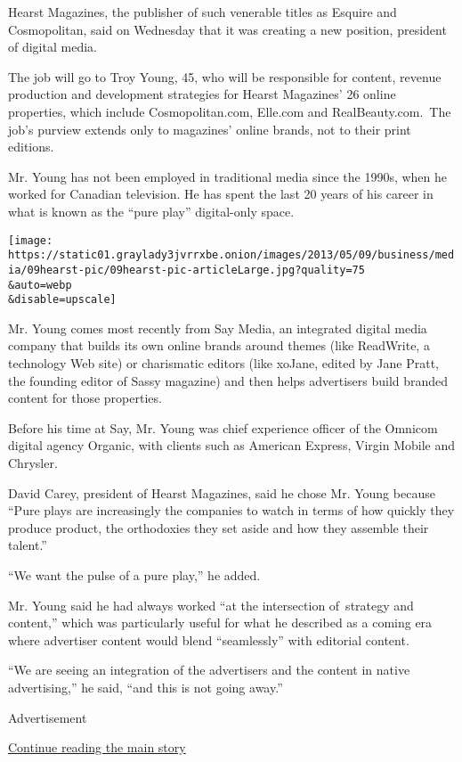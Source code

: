 Hearst Magazines, the publisher of such venerable titles as Esquire and
Cosmopolitan, said on Wednesday that it was creating a new position,
president of digital media.

The job will go to Troy Young, 45, who will be responsible for content,
revenue production and development strategies for Hearst Magazines' 26
online properties, which include Cosmopolitan.com, Elle.com and
RealBeauty.com.~The job's purview extends only to magazines' online
brands, not to their print editions.

Mr. Young has not been employed in traditional media since the 1990s,
when he worked for Canadian television. He has spent the last 20 years
of his career in what is known as the ``pure play'' digital-only space.

\texttt{[image: https://static01.graylady3jvrrxbe.onion/images/2013/05/09/business/media/09hearst-pic/09hearst-pic-articleLarge.jpg?quality=75\\\&auto=webp\\\&disable=upscale]}

Mr. Young comes most recently from Say Media, an integrated digital
media company that builds its own online brands around themes (like
ReadWrite, a technology Web site) or charismatic editors (like xoJane,
edited by Jane Pratt, the founding editor of Sassy magazine) and then
helps advertisers build branded content for those properties.

Before his time at Say, Mr. Young was chief experience officer of the
Omnicom digital agency Organic, with clients such as American Express,
Virgin Mobile and Chrysler.

David Carey, president of Hearst Magazines, said he chose Mr. Young
because ``Pure plays are increasingly the companies to watch in terms of
how quickly they produce product, the orthodoxies they set aside and how
they assemble their talent.''

``We want the pulse of a pure play,'' he added.

Mr. Young said he had always worked ``at the intersection of~strategy
and content,'' which was particularly useful for what he described as a
coming era where advertiser content would blend ``seamlessly'' with
editorial content.

``We are seeing an integration of the advertisers and the content in
native advertising,'' he said, ``and this is not going away.''

Advertisement

\protect\hyperlink{after-bottom}{Continue reading the main story}

